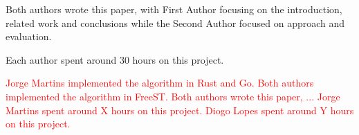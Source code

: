 \documentclass[runningheads]{llncs}
\begin{document}
Both authors wrote this paper, with First Author focusing on the introduction, related work and conclusions while the Second Author focused on approach and evaluation.

Each author spent around 30 hours on this project.

\textcolor{red}{Jorge Martins implemented the algorithm in Rust and Go. Both authors implemented the algorithm in FreeST.
Both authors wrote this paper, ... 
Jorge Martins spent around X hours on this project. Diogo Lopes spent around Y hours on this project.}


\end{document}

